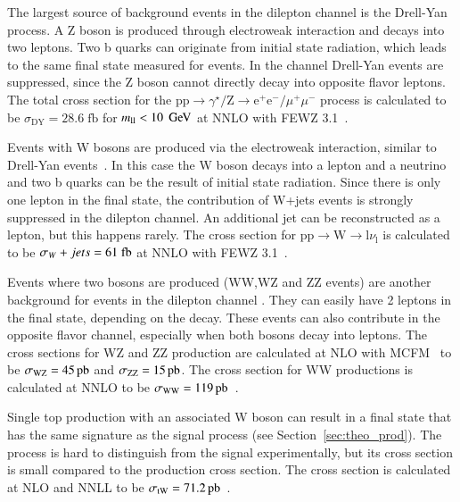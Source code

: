 The largest source of background events in the dilepton channel is the  Drell-Yan~\cite{CarloniCalame:2007cd} process. A Z boson is produced through electroweak interaction and decays into two leptons. Two b quarks can originate from initial state radiation, which leads to the
same final state measured for \ttbar events. In the \emu channel Drell-Yan events are suppressed, since the Z boson cannot directly decay into opposite flavor leptons.
The total cross section for the $\mathrm{pp}\rightarrow\gamma^{\star}/\mathrm{Z}\rightarrow \mathrm{e}^+\mathrm{e}^- / \mu^+ \mu^-$ process is calculated to be $\sigma_{\mathrm{DY}}= 28.6 \; \si{\femto \barn}$ for 
$m_{\mathrm{ll}} < 10 \; \,\text{Ge\hspace{-.08em}V}$ at NNLO with FEWZ 3.1~\cite{Gavin:2010az}.

Events with W bosons are produced via the electroweak interaction, similar to Drell-Yan events~\cite{PhysRevD.86.034021}. In this case the W boson decays into a lepton and a neutrino and two b quarks can be the result of
initial state radiation. Since there is only one lepton in the final state, the contribution of W+jets events is strongly suppressed in the dilepton channel. An additional jet can be reconstructed as a lepton, but this happens rarely.
The cross section for $\mathrm{pp}\rightarrow\mathrm{W}\rightarrow \mathrm{l}\nu_{\mathrm{l}}$ is calculated to be $\sigma_\Wjets=61 \;\si{\femto \barn}$ at NNLO with FEWZ 3.1~\cite{Gavin:2010az}.

Events where two bosons are produced (WW,WZ and ZZ events)\cite{doi:10.1146/annurev-nucl-102010-130106} are another background for \ttbar events in the dilepton channel . They can easily have 2 leptons in the final state, depending on the decay. These events can also contribute in the opposite flavor channel, especially when both bosons decay into leptons.
The cross sections for WZ and ZZ production are calculated at NLO with MCFM~\cite{Campbell:1999ah,Campbell:2011bn} to be $\sigma_{\mathrm{WZ}}=45\mbox{\ensuremath{\,\text{pb}}}$ and  $\sigma_{\mathrm{ZZ}}=15\mbox{\ensuremath{\,\text{pb}}}$.
The cross section for WW productions is calculated at NNLO to be $\sigma_{\mathrm{WW}}=119\mbox{\ensuremath{\,\text{pb}}}$~\cite{Gehrmann:2014fva}.

Single top production with an associated W boson can result in a final state that has the same signature as the \ttbar signal process (see Section~\ref{sec:theo_prod}). The process is hard to distinguish from the \ttbar signal experimentally, but its cross section is small compared to the \ttbar production cross section. 
The cross section is calculated at NLO and NNLL to be $\sigma_{\mathrm{tW}}= 71.2\mbox{\ensuremath{\,\text{pb}}}$~\cite{bib:twchan}.




